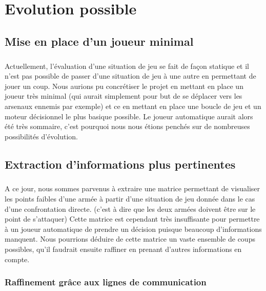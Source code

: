 \chapter{Evolution possible}

	\section{Mise en place d'un joueur minimal}
	
	\paragraph{}
	Actuellement, l'évaluation d'une situation de jeu se fait de façon statique et il n'est pas possible de passer d'une situation de jeu à une autre
	en permettant de jouer un coup. Nous aurions pu concrétiser le projet en mettant en place un joueur très minimal (qui aurait simplement pour but de
	se déplacer vers les arsenaux ennemis par exemple) et ce en mettant en place une boucle de jeu et un moteur décisionnel le plus basique possible.
	Le joueur automatique aurait alors été très sommaire, c'est pourquoi nous nous étions penchés sur de nombreuses possibilités d'évolution.

	\section{Extraction d'informations plus pertinentes}
		
		\paragraph{}
		A ce jour, nous sommes parvenus à extraire une matrice permettant de visualiser les points faibles d'une armée à partir d'une situation de jeu donnée
		dans le cas d'une confrontation directe. (c'est à dire que les deux armées doivent être sur le point de s'attaquer)
		Cette matrice est cependant très insuffisante pour permettre à un joueur automatique de prendre un décision puisque beaucoup d'informations manquent.
		Nous pourrions déduire de cette matrice un vaste ensemble de coups possibles, qu'il faudrait ensuite raffiner en prenant d'autres informations en compte.
	
		\subsection{Raffinement grâce aux lignes de communication}
	
